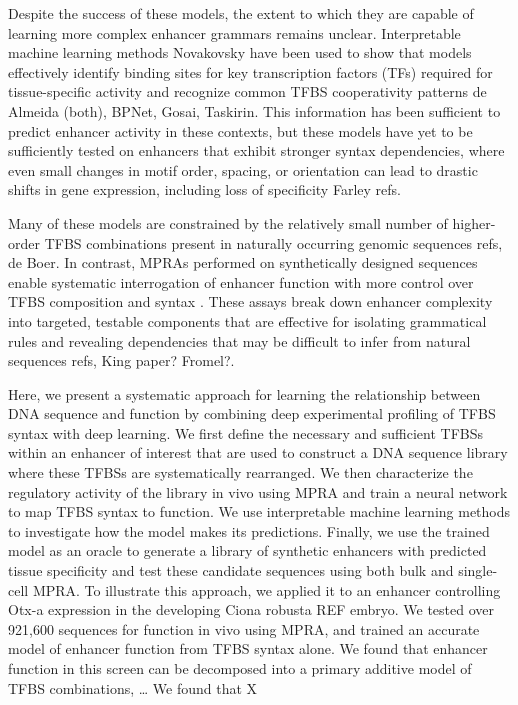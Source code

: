 Despite the success of these models, the extent to which they are capable of learning more  complex enhancer grammars remains unclear. Interpretable machine learning methods {Novakovsky} have been used to show that models effectively identify binding sites for key transcription factors (TFs) required for tissue-specific activity and recognize common TFBS cooperativity patterns {de Almeida (both), BPNet, Gosai, Taskirin}. This information has been sufficient to predict enhancer activity in these contexts, but these models have yet to be sufficiently tested on enhancers that exhibit stronger syntax dependencies, where even small changes in motif order, spacing, or orientation can lead to drastic shifts in gene expression, including loss of specificity {Farley refs}. 

Many of these models are constrained by the relatively small number of higher-order TFBS combinations present in naturally occurring genomic sequences {refs, de Boer}. In contrast, MPRAs performed on synthetically designed sequences enable systematic interrogation of enhancer function with more control over TFBS composition and syntax {}. These assays break down enhancer complexity into targeted, testable components that are effective for isolating grammatical rules and revealing dependencies that may be difficult to infer from natural sequences {refs, King paper? Fromel?}.

Here, we present a systematic approach for learning the relationship between DNA sequence and function by combining deep experimental profiling of TFBS syntax with deep learning. 
We first define the necessary and sufficient TFBSs within an enhancer of interest that are used to construct a DNA sequence library where these TFBSs are systematically rearranged. 
We then characterize the regulatory activity of the library in vivo using MPRA and train a neural network to map TFBS syntax to function. 
We use interpretable machine learning methods to investigate how the model makes its predictions.
Finally, we use the trained model as an oracle to generate a library of synthetic enhancers with predicted tissue specificity and test these candidate sequences using both bulk and single-cell MPRA.
To illustrate this approach, we applied it to an enhancer controlling Otx-a expression in the developing Ciona robusta {REF} embryo. We tested over 921,600 sequences for function in vivo using MPRA, and trained an accurate model of enhancer function from TFBS syntax alone. We found that enhancer function in this screen can be decomposed into a primary additive model of TFBS combinations, … We found that X%


